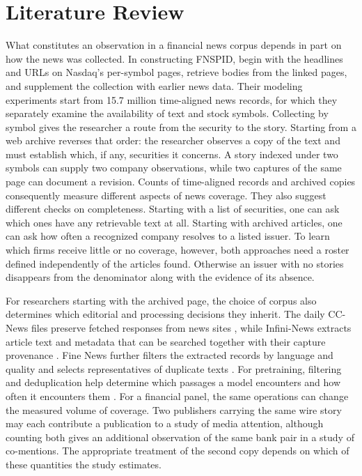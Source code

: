 \section{Literature Review}
\label{sec:literature}

What constitutes an observation in a financial news corpus depends in
part on how the news was collected. In constructing FNSPID,
\citet{dong2024} begin with the headlines and URLs on Nasdaq's
per-symbol pages, retrieve bodies from the linked pages, and supplement
the collection with earlier news data. Their modeling experiments start
from 15.7 million time-aligned news records, for which they separately
examine the availability of text and stock symbols. Collecting by symbol
gives the researcher a route from the security to the story. Starting
from a web archive reverses that order: the researcher observes a copy
of the text and must establish which, if any, securities it concerns.
A story indexed under two symbols can supply two company observations,
while two captures of the same page can document a revision. Counts of
time-aligned records and archived copies consequently measure different
aspects of news coverage. They also suggest different checks on
completeness. Starting with a list of securities, one can ask which
ones have any retrievable text at all. Starting with archived articles,
one can ask how often a recognized company resolves to a listed issuer.
To learn which firms receive little or no coverage, however, both
approaches need a roster defined independently of the articles found.
Otherwise an issuer with no stories disappears from the denominator
along with the evidence of its absence.

For researchers starting with the archived page, the choice of corpus
also determines which editorial and processing decisions they inherit.
The daily CC-News files preserve fetched responses from news sites
\citep{nagel2016}, while Infini-News extracts article text and metadata
that can be searched together with their capture provenance
\citep{lazzaroni2026}. Fine News further filters the extracted records by
language and quality and selects representatives of duplicate texts
\citep{solovev2026}. For pretraining, filtering and deduplication help
determine which passages a model encounters and how often it encounters
them \citep{penedo2023}. For a financial panel, the same operations
can change the measured volume of coverage. Two publishers carrying the
same wire story may each contribute a publication to a study of media
attention, although counting both gives an additional observation of the
same bank pair in a study of co-mentions. The appropriate treatment of
the second copy depends on which of these quantities the study estimates.

